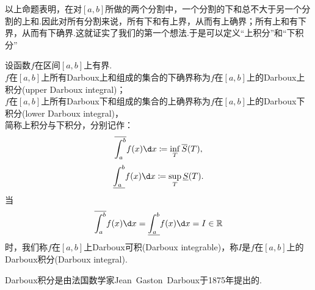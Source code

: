 以上命题表明，在对$\left[a,b\right]$所做的两个分割中，一个分割的下和总不大于另一个分割的上和.因此对所有分割来说，所有下和有上界，从而有上确界；所有上和有下界，从而有下确界.这就证实了我们的第一个想法.于是可以定义“上积分”和“下积分”
\begin{definition}[Darboux积分]
	设函数$f$在区间$\left[a,b\right]$上有界.\\
	$f$在$\left[a,b\right]$上所有Darboux上和组成的集合的下确界称为$f$在$\left[a,b\right]$上的{\heiti Darboux上积分}(upper Darboux integral)；\\
	$f$在$\left[a,b\right]$上所有Darboux下和组成的集合的上确界称为$f$在$\left[a,b\right]$上的{\heiti Darboux下积分}(lower Darboux integral)，\\
	简称上积分与下积分，分别记作：
	$$\overline{\int_{a}^{b}}f(x)\d x\coloneqq\inf\limits_{T}\overline{S}(T),$$
	$$\underline{\int_{a}^{b}}f(x)\d x\coloneqq\sup\limits_{T}\underline{S}(T).$$
	当
	$$\overline{\int_{a}^{b}}f(x)\d x=\underline{\int_{a}^{b}}f(x)\d x=I\in\mathbb{R}$$
	时，我们称$f$在$\left[a,b\right]$上{\heiti Darboux可积}(Darboux integrable)，称$I$是$f$在$\left[a,b\right]$上的{\heiti Darboux积分}(Darboux integral).
\end{definition}
\begin{remark}
	Darboux积分是由法国数学家Jean\ Gaston\ Darboux于1875年提出的.
\end{remark}

